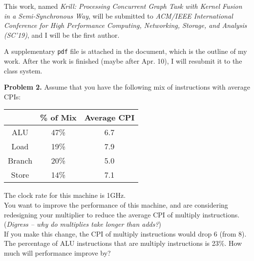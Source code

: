 \documentclass[english]{thesis}
\begin{document}
This work, named \emph{Krill: Processing Concurrent Graph Task with Kernel Fusion in a Semi-Synchronous Way}, will be submitted to \emph{ACM/IEEE International Conference for High Performance Computing, Networking, Storage, and Analysis (SC'19)}, and I will be the first author.

A supplementary \verb'pdf' file is attached in the document, which is the outline of my work.
After the work is finished (maybe after Apr. 10), I will resubmit it to the class system.

\bigskip
\textbf{Problem 2.} Assume that you have the following mix of instructions with average CPIs:
\begin{center}
\begin{tabular}{|c|c|c|}\hline
 & \% of Mix & Average CPI \\\hline
ALU & 47\% & 6.7\\\hline
Load & 19\% & 7.9\\\hline
Branch & 20\% & 5.0\\\hline
Store & 14\% & 7.1 \\\hline
\end{tabular}
\end{center}
The clock rate for this machine is 1GHz.\\
You want to improve the performance of this machine, and are considering redesigning your multiplier to reduce the average CPI of multiply instructions. (\emph{Digress -- why do multiplies take longer than adds?})\\
If you make this change, the CPI of multiply instructions would drop 6 (from 8).
The percentage of ALU instructions that are multiply instructions is 23\%.
How much will performance improve by?
\bigskip
\end{document}
